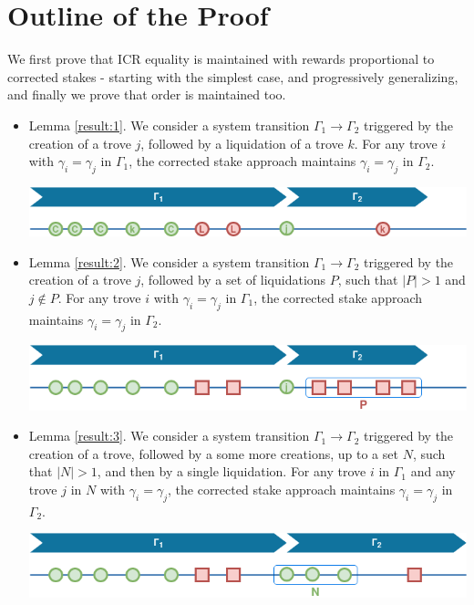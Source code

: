 \documentclass[reqno]{article}
\begin{document}
\section{Outline of the Proof}

We first prove that ICR equality is maintained with rewards proportional to corrected stakes - starting with the simplest case, and progressively generalizing, and finally we prove that order is maintained too.

\begin{itemize}
  \item Lemma \ref{result:1}. We consider a system transition $\Gamma_1 \rightarrow \Gamma_2$ triggered by the creation of a trove $j$, followed by a liquidation of a trove $k$. For any trove $i$ with $\gamma_i = \gamma_j$ in $\Gamma_1$, the corrected stake approach maintains $\gamma_i = \gamma_j$ in $\Gamma_2$.

    \includegraphics[width=\linewidth]{System_order_evolution_1.png}

  \item Lemma \ref{result:2}. We consider a system transition $\Gamma_1 \rightarrow \Gamma_2$ triggered by the creation of a trove $j$, followed by a set of liquidations $P$, such that $|P| > 1$ and $j \notin P$. For any trove $i$ with $\gamma_i = \gamma_j$ in $\Gamma_1$, the corrected stake approach maintains $\gamma_i = \gamma_j$ in $\Gamma_2$.

    \includegraphics[width=\linewidth]{System_order_evolution_2.png}

  \item Lemma \ref{result:3}. We consider a system transition $\Gamma_1 \rightarrow \Gamma_2$ triggered by the creation of a trove, followed by a some more creations, up to a set $N$, such that $|N| > 1$, and then by a single liquidation. For any trove $i$ in $\Gamma_1$ and any trove $j$ in $N$ with $\gamma_i = \gamma_j$, the corrected stake approach maintains $\gamma_i = \gamma_j$ in $\Gamma_2$.

    \includegraphics[width=\linewidth]{System_order_evolution_3.png}


\end{itemize}
\end{document}
